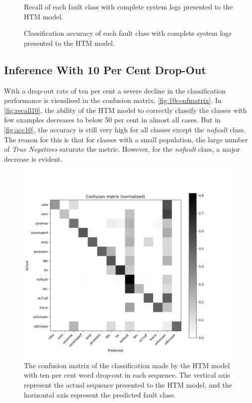 \begin{figure}[H]
  \centering
    \scalebox{.61}{}
    \caption{Recall of each fault class with complete system logs presented to the HTM model.}
    \label{fig:recall}

    \vspace*{\floatsep}%

    \scalebox{.61}{}
    \caption{Classification accuracy of each fault class with complete system logs presented to the HTM model.}
    \label{fig:acc}
\end{figure}




\subsection{Inference With 10 Per Cent Drop-Out}
With a drop-out rate of ten per cent a severe decline in the classification performance is visualised in the confusion matrix, \autoref{fig:10confmatrix}. In \autoref{fig:recall10}, the ability of the HTM model to correctly classify the classes with few examples decreases to below 50 per cent in almost all cases. But in \autoref{fig:acc10}, the accuracy is still very high for all classes except the \textit{nofault} class. The reason for this is that for classes with a small population, the large number of \textit{True Negatives} saturate the metric. However, for the \textit{nofault} class, a major decrease is evident.



\begin{figure}[H]
    \vspace{-.5cm}
    \centering
    \includegraphics[width=\textwidth]{results/figures/256_32_10pcterror.png}
    \caption{The confusion matrix of the classification made by the HTM model with ten per cent word drop-out in each sequence. The vertical axis represent the actual sequence presented to the HTM model, and the horizontal axis represent the predicted fault class.}
    \label{fig:10confmatrix}
\end{figure}
\raggedbottom

